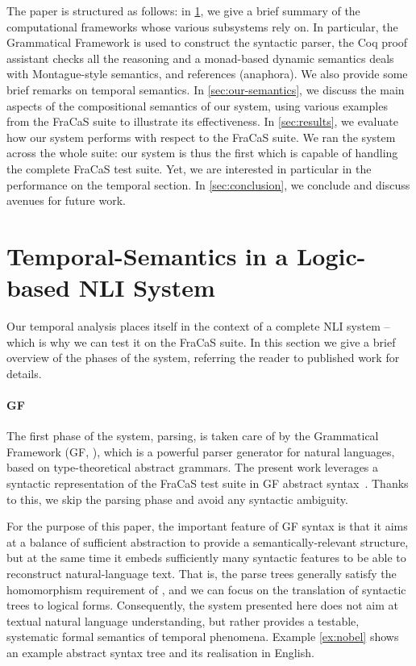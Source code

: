 \documentclass[a4paper,twoside]{article}
\begin{document}
The paper is structured as follows: in \cref{sec:background}, we give
a brief summary of the computational frameworks whose various
subsystems rely on. In particular, the Grammatical Framework is used
to construct the syntactic parser, the Coq proof assistant checks all
the reasoning and a monad-based dynamic semantics deals with
Montague-style semantics, and references (anaphora).  We also provide
some brief remarks on temporal semantics. In \cref{sec:our-semantics},
we discuss the main aspects of the compositional semantics of our
system, using various examples from the FraCaS suite to illustrate its
effectiveness. In \cref{sec:results}, we evaluate how our system
performs with respect to the FraCaS suite. We ran the system across
the whole suite: our system is thus the first which is capable of
handling the complete FraCaS test suite.  Yet, we are interested in
particular in the performance on the temporal section. In
\cref{sec:conclusion}, we conclude and discuss avenues for future
work.


\section{Temporal-Semantics in a Logic-based NLI System}
\label{sec:background}

Our temporal analysis places itself in the context of a complete NLI
system -- which is why we can test it on the FraCaS suite. In this
section we give a brief overview of the phases of the system,
referring the reader to published work for details.

\paragraph{GF}
The first phase of the system, parsing, is taken care of by the 
Grammatical Framework (GF, \citet{ranta_grammatical_2004}), which is a
powerful parser generator for natural languages, based on
type-theoretical abstract grammars.  The present work leverages a
syntactic representation of the FraCaS test suite in GF abstract
syntax~\citep{Ljunglof:2012}. Thanks to this, we skip the parsing
phase and avoid any syntactic ambiguity.

For the purpose of this paper, the important feature of GF
syntax is that it aims at a balance of sufficient abstraction to provide a
semantically-relevant structure, but at the same time it embeds
sufficiently many syntactic features to be able to reconstruct
natural-language text. That is, the parse trees generally satisfy the
homomorphism requirement of \citet{montague_english_1970,montague_proper_1974}, and
we can focus on the translation of syntactic trees to logical forms.
%
Consequently, the system presented
here does not aim at textual natural language understanding, but rather
provides a testable, systematic formal semantics of temporal phenomena.
Example \ref{ex:nobel} shows an example abstract syntax tree and its
realisation in English.
\end{document}
